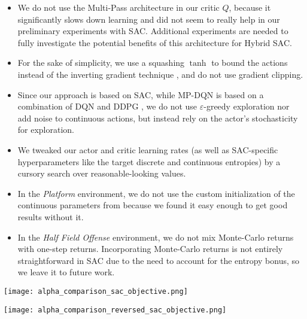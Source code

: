 \documentclass[letterpaper]{article} \usepackage{aaai20}  \usepackage{times}  \usepackage{helvet} \usepackage{courier}  \usepackage[hyphens]{url}  \usepackage{graphicx} \urlstyle{rm} \def\UrlFont{\rm}  \usepackage{graphicx}  \usepackage[section]{placeins}
\newcommand{\citet}{\cite}  \newcommand{\citep}{\cite} \DeclareMathOperator*{\softmax}{softmax}
\begin{document}
\begin{itemize}
    \item We do not use the Multi-Pass architecture in our critic $Q$, because it significantly slows down learning and did not seem to really help in our preliminary experiments with SAC.
    Additional experiments are needed to fully investigate the potential benefits of this architecture for Hybrid SAC.
    \item For the sake of simplicity, we use a squashing $\tanh$ to bound the actions instead of the inverting gradient technique \citep{hausknecht2016}, and do not use gradient clipping.
    \item Since our approach is based on SAC, while MP-DQN is based on a combination of DQN \citep{mnih2015human} and DDPG \citep{lillicrap2016}, we do not use $\varepsilon$-greedy exploration nor add noise to continuous actions, but instead rely on the actor's stochasticity for exploration.
    \item We tweaked our actor and critic learning rates (as well as SAC-specific hyperparameters like the target discrete and continuous entropies) by a cursory search over reasonable-looking values.
    \item In the {\em Platform} environment, we do not use the custom initialization of the continuous parameters from \citet{bester2019} because we found it easy enough to get good results without it.
    \item In the {\em Half Field Offense} environment, we do not mix Monte-Carlo returns with one-step returns. Incorporating Monte-Carlo returns is not entirely straightforward in SAC due to the need to account for the entropy bonus, so we leave it to future work.
\end{itemize}

\begin{figure*}[!htbp]
\centering
\texttt{[image: alpha\_comparison\_sac\_objective.png]} \caption{Comparison between the final shapes of the policy distribution $\pi_\phi$ (in orange) trained with the same objective as SAC after trying to match a Gaussian mixture $\pi$ (in blue) with different temperatures $\alpha$ for 10,000 steps. Note the collapse of the policies on one mode of $\pi$ unless $\alpha$ gets very high, for both normalizing flows (top row) and Gaussian policy (bottom row).
}
\label{fig_alpha_comparison_sac_objective}
\end{figure*}

\begin{figure*}[!htbp]
\centering
\texttt{[image: alpha\_comparison\_reversed\_sac\_objective.png]} \caption{Same as Fig.~\ref{fig_alpha_comparison_sac_objective} but swapping the arguments of the KL divergence objective. Note that the policies no longer collapse onto a single mode of the target $\pi$, and the normalizing flow policy is better able to approximate the shape of $\pi$.}
\label{fig_alpha_comparison_reversed_sac_objective}
\end{figure*}
\end{document}
